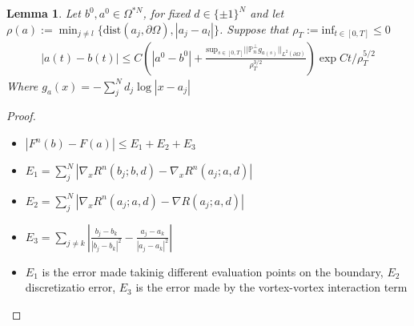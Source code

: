 \documentclass[12pt, a4paper]{article}
\theoremstyle{plain}
\newtheorem{lemma}[theorem]{Lemma}
\theoremstyle{definition}
\begin{document}
\begin{lemma}
  Let $b^0, a^0 \in \Omega^{*N}$, for fixed $d \in \{\pm1\}^N$
  and let $\rho(a) := \min_{j\neq l} \{\text{dist}(a_j, \partial\Omega) , |a_j - a_l|\}$.
  Suppose that $\rho_T:= \text{inf}_{t\in [0,T]} \leq 0$
  \begin{align}
  |a(t) - b(t)| \leq  C (|a^0-b^0| + \frac{\text{sup}_{s\in [0,T]}||\mathbb{P}^\perp_n g_{a(s)}||_{L^2(\partial \Omega)}}{\rho^{3/2}_T})\exp{C t /\rho^{5/2}_T}
  \end{align}
  Where $g_a(x) = - \sum^N_j d_j \log |x-a_j|$
\end{lemma} 
\begin{proof}
    \begin{itemize}
\item $|F^n(b) - F(a)| \leq E_1 + E_2 + E_3$
\item $E_1 = \sum_j^N |\nabla_x R^n(b_j; b ,d) - \nabla_x R^n(a_j; a, d)|$
\item $E_2 = \sum_j^N |\nabla_x R^n (a_j; a, d) - \nabla R (a_j; a, d)|$
\item $E_3 = \sum_{j \neq k} |\frac{b_j - b_k}{|b_j - b_k|^2} - \frac{a_j - a_k}{|a_j - a_k|^2}|$
\item $E_1$ is the error made takinig different evaluation points on the boundary, $E_2$ discretizatio error, $E_3$ is the error made by the vortex-vortex interaction term
    \end{itemize}


\end{proof}
\end{document}
